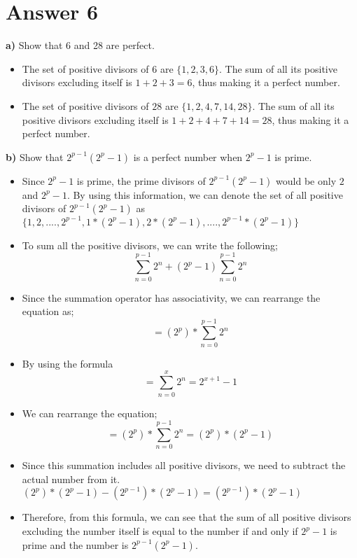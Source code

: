 \documentclass[12pt]{article}
\begin{document}
\section*{Answer 6}

\textbf{a)} Show that 6 and 28 are perfect.
\begin{itemize}
    \item The set of positive divisors of $6$ are $ \{1,2,3,6\} $. The sum of all its positive divisors excluding itself is $1+2+3=6$, thus making it a perfect number. 
    \item The set of positive divisors of $28$ are $ \{1,2,4,7,14,28\} $. The sum of all its positive divisors excluding itself is $1+2+4+7+14=28$, thus making it a perfect number. 
\end{itemize}

\textbf{b)} Show that $2^{p-1}(2^p-1)$ is a perfect number when $2^p-1$ is prime.
\begin{itemize}
    \item Since $2^p-1$ is prime, the prime divisors of $2^{p-1}(2^p-1)$ would be only $2$ and $2^p-1$. By using this information, we can denote the set of all positive divisors of $2^{p-1}(2^p-1)$ as $\{1,2,....,2^{p-1},1*(2^p-1),2*(2^p-1),....,2^{p-1}*(2^p-1)\}$
    \item To sum all the positive divisors, we can write the following;
    \subitem  $$\sum\limits_{n=0}^{p-1}2^n+ (2^p-1)\sum\limits_{n=0}^{p-1} 2^n $$ 
    \item Since the summation operator has associativity, we can rearrange the equation as;
     \subitem $$=(2^p)*\sum\limits_{n=0}^{p-1} 2^n$$
     \item By using the formula
     \subitem $$=\sum\limits_{n=0}^{x} 2^n = 2^{x+1}-1$$
     \item We can rearrange the equation;
     \subitem $$=(2^p)*\sum\limits_{n=0}^{p-1} 2^n = (2^p)*(2^p-1)$$
     \item Since this summation includes all positive divisors, we need to subtract the actual number from it.
     \subitem $(2^p)*(2^p-1) - (2^{p-1})*(2^p-1) = (2^{p-1})*(2^p-1)$
    \item Therefore, from this formula, we can see that the sum of all positive divisors excluding the number itself is equal to the number if and only if $2^p-1$ is prime and the number is $2^{p-1}(2^p-1)$.
\end{itemize}
\end{document}

